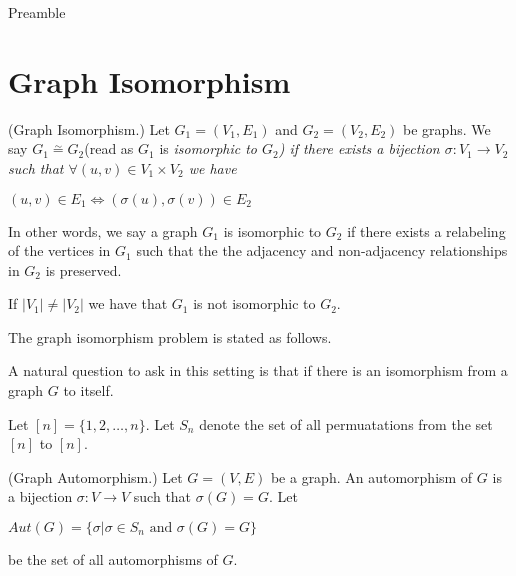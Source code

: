 \noindent
Preamble


\section{Graph Isomorphism}


\begin{defn}(Graph Isomorphism.)
Let $G_1=(V_1,E_1)$ and $G_2=(V_2,E_2)$ be graphs. We say $G_1\stackrel{\sim}{=}G_2$(read as $G_1$ is \em isomorphic to $G_2$) if there exists a bijection $\sigma : V_1\rightarrow V_2$ such that $\forall (u,v) \in V_1\times V_2$ we have
\begin{center}
$(u,v)\in E_1 \iff (\sigma(u),\sigma(v))\in E_2$
\end{center}
\end{defn}

In other words, we say a graph $G_1$ is isomorphic to $G_2$ if there exists a relabeling of the vertices in $G_1$  such that the the adjacency and non-adjacency relationships in $G_2$ is preserved. 
\begin{obs}
If $|V_1|\neq |V_2|$ we have that $G_1$ is not isomorphic to $G_2$.
\end{obs}

The graph isomorphism problem is stated as follows. 
\begin{center}
\end{center}

A natural question to ask in this setting is that if there is an isomorphism from a graph $G$ to itself. 

Let $[n]=\{1,2,\ldots,n\}$. Let $S_n$ denote the set of all permuatations from the set $[n]$ to $[n]$.

\begin{defn}(Graph Automorphism.) 
Let $G=(V,E)$ be a graph. An automorphism of $G$ is a bijection $\sigma:V\rightarrow V$ such that $\sigma(G)= G$. Let
\begin{center}
$Aut(G)= \{\sigma | \sigma\in S_n \text{~and~} \sigma(G)= G \}$
\end{center}
be the set of all automorphisms of $G$. 
\end{defn}



